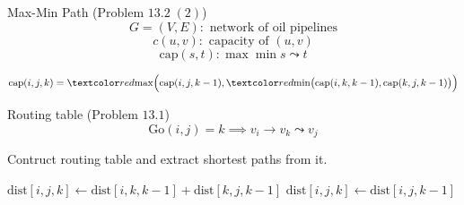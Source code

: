 \begin{frame}{}
  \begin{exampleblock}{Max-Min Path (Problem $13.2\; (2)$)}
    \[
      G = (V, E): \text{ network of oil pipelines}
    \]
    \[
      c(u,v): \text{ capacity of } (u,v)
    \]
    \[
      \text{cap}(s,t): \max \min s \leadsto t
    \]
      
    \vspace{0.30cm}
    \centerline{}
  \end{exampleblock}

  \pause
  \[
    \text{cap}(i,j,k) = \red{\max}\Big(\text{cap}(i,j,k-1), \red{\min}\big(\text{cap}(i,k,k-1), \text{cap}(k,j,k-1)\big)\Big)
  \]
\end{frame}
\begin{frame}{}
  \begin{exampleblock}{Routing table (Problem $13.1$)}
    \[
      \text{Go}(i,j) = k \implies v_i \to v_k \leadsto v_j
    \]

    Contruct routing table and extract shortest paths from it.
  \end{exampleblock}

  \pause
  \vspace{0.30cm}
  \begin{algorithmic}
	    \State $\text{dist}[i,j,k] \gets \text{dist}[i,k,k-1] + \text{dist}[k,j,k-1]$
	    \uncover<3->{\State \textcolor{red}{$\text{Go}[i,j] \gets \text{Go}[i,k]$}}
	  \Else
	    \State $\text{dist}[i,j,k] \gets \text{dist}[i,j,k-1]$
	  \EndIf
	\EndFor
      \EndFor
    \EndFor
  \end{algorithmic}
\end{frame}

